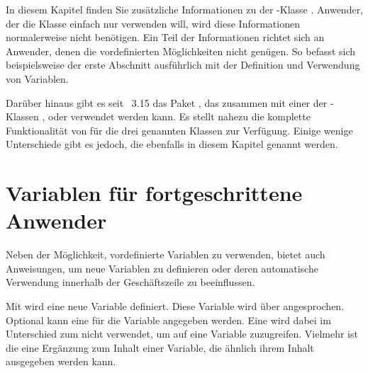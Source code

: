 \BeginIndexGroup%
%
In diesem Kapitel finden Sie zusätzliche Informationen zu der
\KOMAScript-Klasse . %
Anwender, der die Klasse einfach nur verwenden will, wird diese Informationen
normalerweise nicht benötigen. Ein Teil der Informationen richtet sich an
Anwender, denen die vordefinierten Möglichkeiten nicht genügen. So
befasst sich beispielsweise der erste Abschnitt ausführlich mit der Definition
und Verwendung von Variablen.%
\iffalse%
\ Darüber hinaus finden sich in diesem Kapitel auch Informationen über
Möglichkeiten, die aus Gründen der Verbesserung der Kompatibilität zur
obsoleten \KOMAScript-Klasse \Class{scrlettr} geschaffen wurden. Es wird auch
ausführlich erklärt, wie man einen Brief dieser veralteten Klasse auf die
aktuelle Briefklasse übertragen kann.  \fi

%
Darüber hinaus gibt es seit
\KOMAScript~3.15 das Paket
, das zusammen mit einer der
\KOMAScript-Klassen ,  oder 
verwendet werden kann. Es stellt nahezu die komplette Funktionalität von
 für die drei genannten Klassen zur Verfügung. Einige wenige
Unterschiede gibt es jedoch, die ebenfalls in diesem Kapitel genannt werden.%


\section{Variablen für fortgeschrittene Anwender}
\BeginIndexGroup
{}

Neben der Möglichkeit, vordefinierte Variablen zu verwenden, bietet
\KOMAScript{} auch Anweisungen, um neue Variablen zu definieren oder deren
automatische Verwendung innerhalb der Geschäftszeile zu beeinflussen.


\begin{Declaration}
\end{Declaration}
Mit  wird eine neue Variable definiert. Diese Variable wird
über  angesprochen. Optional kann eine  für die
Variable  angegeben werden. Eine  wird dabei im
Unterschied zum  nicht verwendet, um auf eine Variable
zuzugreifen. Vielmehr ist die  eine Ergänzung zum Inhalt
einer Variable, die ähnlich ihrem Inhalt ausgegeben werden kann. 

